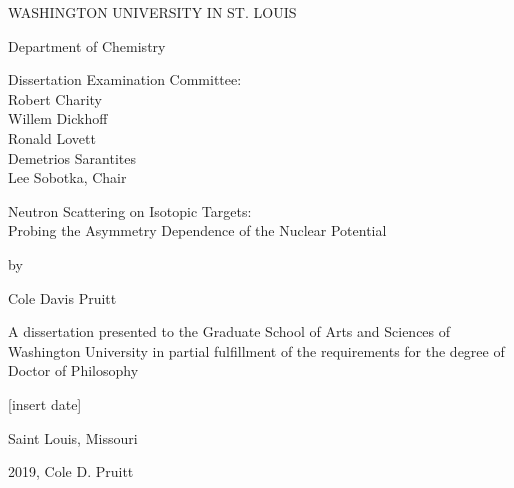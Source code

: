 \begin{titlepage}
\begin{singlespace}
  \begin{center}
        \vspace*{1cm}
        
        WASHINGTON UNIVERSITY IN ST. LOUIS
        
        \vspace{0.5cm}
        Department of Chemistry
        
        \vspace{1.5cm}

        Dissertation Examination Committee:\\
        Robert Charity\\
        Willem Dickhoff\\ 
        Ronald Lovett\\
        Demetrios Sarantites\\
        Lee Sobotka, Chair\\
    
        \vspace{1.5 cm}

        Neutron Scattering on Isotopic Targets:\\
        Probing the Asymmetry Dependence of the Nuclear Potential

        \vspace{0.5 cm}

        by

        \vspace{0.5 cm}
        
        Cole Davis Pruitt
        
        \vfill
        
        A dissertation presented to the Graduate School of Arts and Sciences of Washington University in partial fulfillment of the requirements for the degree of Doctor of Philosophy
        
        \vspace{0.8cm}
        
        [insert date]
        
        \vspace{0.5 cm}
        Saint Louis, Missouri
        
      \end{center}
      \end{singlespace}
    \end{titlepage}
    
    \clearpage
    
    \vspace*{\fill}
    \begin{center}    
      \textcopyright \hspace{2pt} 2019, Cole D. Pruitt
    \end{center}
    \vspace*{\fill}
    
    \thispagestyle{empty} %
    \addtocounter{page}{-1}%
    \clearpage
